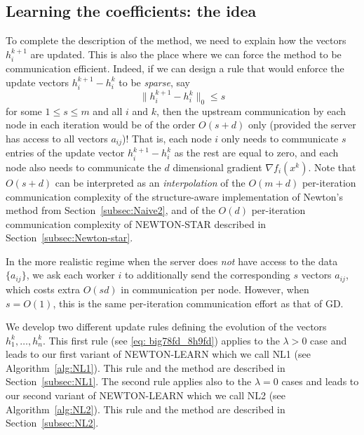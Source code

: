 \documentclass[12pt]{article}
\begin{document}
\subsection{Learning the coefficients: the idea}
To complete the description of the method, we need to explain how the vectors $h_i^{k+1}$ are updated. This is also the place where we can force the method to be communication efficient. Indeed, if we can design a rule that would enforce the update vectors $h_i^{k+1}-h_i^k$ to be {\em sparse}, say \begin{equation}\label{eq:sparse_update}\|h_i^{k+1}-h_i^k\|_0 \leq s \end{equation} for some $1 \leq s \leq m$ and all $i$ and $k$, then  the upstream communication by each node in each iteration would be of the order $O(s+d)$ only (provided the server has access to all vectors $a_{ij}$)! That is, each node $i$ only needs to communicate $s$ entries of the update vector $h_i^{k+1}-h_i^k$ as the rest are equal to zero, and each node also needs to communicate the $d$ dimensional gradient $\nabla f_i(x^k)$.  Note that $O(s+d)$ can be interpreted as an {\em interpolation} of the $O(m+d)$   per-iteration communication complexity  of the structure-aware implementation of Newton's method from  Section~\ref{subsec:Naive2}, and of the  $O(d)$   per-iteration communication complexity  of {\sf NEWTON-STAR} described in   Section~\ref{subsec:Newton-star}. 

In the more realistic regime when the server does {\em not} have access to the data $\{a_{ij}\}$, we ask each worker $i$ to additionally send the corresponding $s$ vectors $a_{ij}$, which costs extra $O(s d)$ in communication per node. However, when $s=O(1)$, this is the same per-iteration communication effort as that of GD.

We develop two different update rules defining the evolution of the vectors $h_1^k, \dots, h_n^k$. This first rule (see \eqref{eq: big78fd_8h9fd}) applies to the $\lambda>0$ case and leads to our first variant of {\sf NEWTON-LEARN} which we call {\sf NL1} (see Algorithm~\ref{alg:NL1}). This rule and the method are described in Section~\ref{subsec:NL1}. The second rule applies also to the $\lambda=0$ cases and leads to our second variant of {\sf NEWTON-LEARN} which we call {\sf NL2} (see Algorithm~\ref{alg:NL2}). This rule and the method are described in Section~\ref{subsec:NL2}. 
\end{document}
